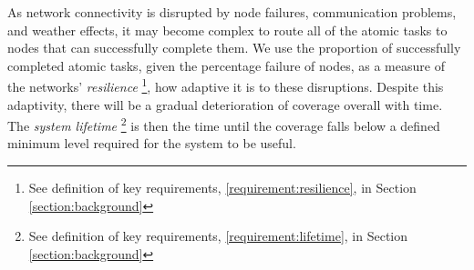 As network connectivity is disrupted by node failures, communication problems, and weather effects, it may become complex to route all of the atomic tasks to nodes that can successfully complete them. We use the proportion of successfully completed atomic tasks, given the percentage failure of nodes, as a measure of the networks' \textit{resilience} \footnote{See definition of key requirements, \ref{requirement:resilience}, in Section \ref{section:background}}, how adaptive it is to these disruptions. Despite this adaptivity, there will be a gradual deterioration of coverage overall with time. The \textit{system lifetime} \footnote{See definition of key requirements, \ref{requirement:lifetime}, in Section \ref{section:background}} is then the time until the coverage falls below a defined minimum level required for the system to be useful. 